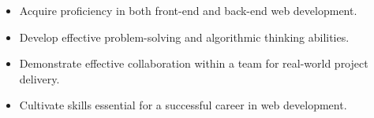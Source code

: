 \begin{itemize}
    \item Acquire proficiency in both front-end and back-end web development.
    \item Develop effective problem-solving and algorithmic thinking abilities.
    \item Demonstrate effective collaboration within a team for real-world project delivery.
    \item Cultivate skills essential for a successful career in web development.
\end{itemize}
